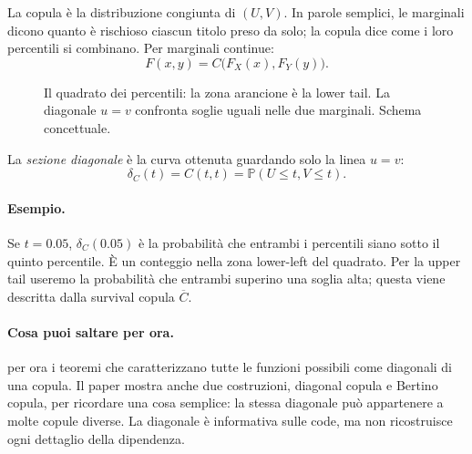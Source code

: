 \documentclass[11pt,a4paper]{article}
\newcommand{\Prob}{\mathbb{P}}
\newcommand{\Esempio}{\paragraph{Esempio.}}
\newcommand{\Salta}{\paragraph{Cosa puoi saltare per ora.}}
\begin{document}
La copula è la distribuzione congiunta di $(U,V)$. In parole semplici, le
marginali dicono quanto è rischioso ciascun titolo preso da solo; la copula
dice come i loro percentili si combinano. Per marginali continue:
\begin{equation}
 F(x,y)=C\bigl(F_X(x),F_Y(y)\bigr).
 \label{eq:sklar}
\end{equation}

\begin{figure}[ht]
\centering
{}
\caption{Il quadrato dei percentili: la zona arancione è la lower tail. La diagonale $u=v$ confronta soglie uguali nelle due marginali. Schema concettuale.}
\label{fig:percentili}
\end{figure}

La \emph{sezione diagonale} è la curva ottenuta guardando solo la linea
$u=v$:
\begin{equation}
 \delta_C(t)=C(t,t)=\Prob(U\leq t,V\leq t).
 \label{eq:diagonal}
\end{equation}
\Esempio Se $t=0.05$, $\delta_C(0.05)$ è la probabilità che entrambi i
percentili siano sotto il quinto percentile. È un conteggio nella zona
lower-left del quadrato. Per la upper tail useremo la probabilità che entrambi
superino una soglia alta; questa viene descritta dalla survival copula
$\overline C$.

\Salta per ora i teoremi che caratterizzano tutte le funzioni possibili come
diagonali di una copula. Il paper mostra anche due costruzioni, diagonal copula
e Bertino copula, per ricordare una cosa semplice: la stessa diagonale può
appartenere a molte copule diverse. La diagonale è informativa sulle code, ma
non ricostruisce ogni dettaglio della dipendenza.
\end{document}
